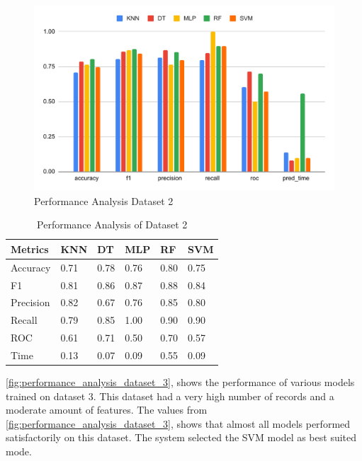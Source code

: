\begin{figure}[ht]
    \centering
    \includegraphics[width=0.9\columnwidth]{media/sec04/dataset_2_performance_evaluation.pdf}
    \caption{Performance Analysis Dataset 2}
    \label{fig:performance_analysis_dataset_2}
\end{figure}

\begin{table}[ht]
\caption{Performance Analysis of Dataset 2}\label{tab:performance_analysis_dataset_2}
\begin{tabular*}{\tblwidth}{@{}LLLLLL@{}}
\toprule
Metrics & KNN & DT & MLP & RF & SVM \\ %
\midrule
Accuracy & 0.71 & 0.78 & 0.76 & 0.80 & 0.75 \\
F1 & 0.81 & 0.86 & 0.87 & 0.88 & 0.84 \\
Precision & 0.82 & 0.67 & 0.76 & 0.85 & 0.80 \\
Recall & 0.79 & 0.85 & 1.00 & 0.90 & 0.90 \\
ROC & 0.61 & 0.71 & 0.50 & 0.70 & 0.57 \\
Time & 0.13 & 0.07 & 0.09 & 0.55 & 0.09 \\
\bottomrule
\end{tabular*}
\end{table}

\autoref{fig:performance_analysis_dataset_3}, shows the performance of various models trained on dataset 3. This dataset had a very high number of records and a moderate amount of features. The values from \autoref{fig:performance_analysis_dataset_3}, shows that almost all models performed satisfactorily on this dataset. The system selected the SVM model as best suited mode.

